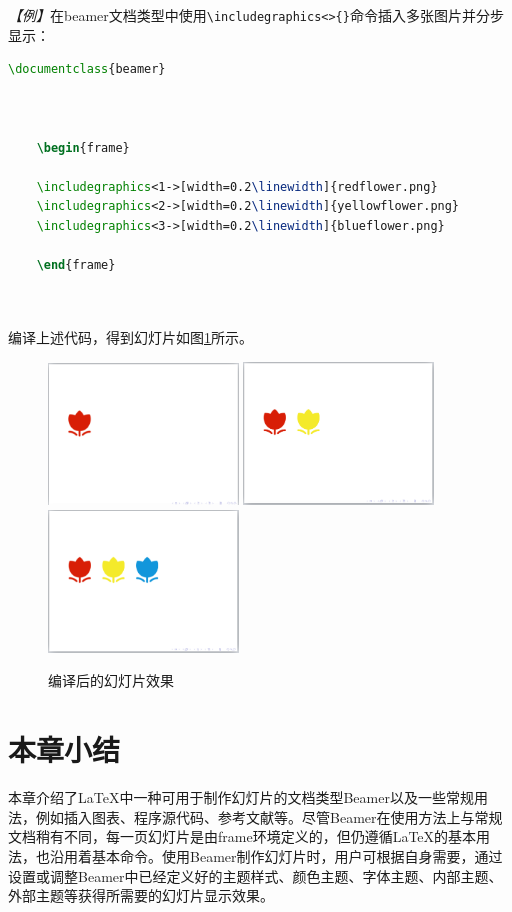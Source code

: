 \emph{【例】}在beamer文档类型中使用\texttt{\textbackslash{}includegraphics<>\{\}}命令插入多张图片并分步显示：
\begin{lstlisting}[language=TeX]
    \documentclass{beamer}

    

    \begin{frame}

    \includegraphics<1->[width=0.2\linewidth]{redflower.png}
    \includegraphics<2->[width=0.2\linewidth]{yellowflower.png}
    \includegraphics<3->[width=0.2\linewidth]{blueflower.png}

    \end{frame}

    
\end{lstlisting}

编译上述代码，得到幻灯片如图\ref{fig:952}所示。

\begin{figure}[htbp]
    \centering
    \includegraphics[width = 0.45\textwidth]{images/ch_9/NEWexample4_1.png}
    \includegraphics[width = 0.45\textwidth]{images/ch_9/NEWexample4_2.png}
    \includegraphics[width = 0.45\textwidth]{images/ch_9/NEWexample4_3.png}
    \caption{编译后的幻灯片效果}
    \label{fig:952}
\end{figure}

\section*{本章小结}

本章介绍了LaTeX中一种可用于制作幻灯片的文档类型Beamer以及一些常规用法，例如插入图表、程序源代码、参考文献等。尽管Beamer在使用方法上与常规文档稍有不同，每一页幻灯片是由frame环境定义的，但仍遵循LaTeX的基本用法，也沿用着基本命令。使用Beamer制作幻灯片时，用户可根据自身需要，通过设置或调整Beamer中已经定义好的主题样式、颜色主题、字体主题、内部主题、外部主题等获得所需要的幻灯片显示效果。
